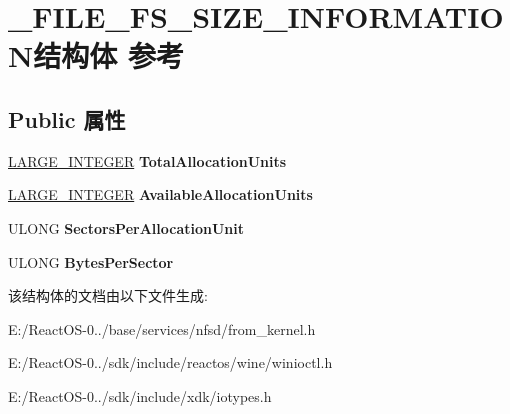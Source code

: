 \hypertarget{struct___f_i_l_e___f_s___s_i_z_e___i_n_f_o_r_m_a_t_i_o_n}{}\section{\+\_\+\+F\+I\+L\+E\+\_\+\+F\+S\+\_\+\+S\+I\+Z\+E\+\_\+\+I\+N\+F\+O\+R\+M\+A\+T\+I\+O\+N结构体 参考}
\label{struct___f_i_l_e___f_s___s_i_z_e___i_n_f_o_r_m_a_t_i_o_n}
\subsection*{Public 属性}
\begin{DoxyCompactItemize}
\item 
\mbox{\label{struct___f_i_l_e___f_s___s_i_z_e___i_n_f_o_r_m_a_t_i_o_n_abc81948e338a1ad72ca8ddcd96fad94d}} 
\hyperlink{union___l_a_r_g_e___i_n_t_e_g_e_r}{L\+A\+R\+G\+E\+\_\+\+I\+N\+T\+E\+G\+ER} {\bfseries Total\+Allocation\+Units}
\item 
\mbox{\label{struct___f_i_l_e___f_s___s_i_z_e___i_n_f_o_r_m_a_t_i_o_n_ac266456104fc22acd3324a9cd8094c68}} 
\hyperlink{union___l_a_r_g_e___i_n_t_e_g_e_r}{L\+A\+R\+G\+E\+\_\+\+I\+N\+T\+E\+G\+ER} {\bfseries Available\+Allocation\+Units}
\item 
\mbox{\label{struct___f_i_l_e___f_s___s_i_z_e___i_n_f_o_r_m_a_t_i_o_n_af42fc8ad469218898445a9f0f7460df9}} 
U\+L\+O\+NG {\bfseries Sectors\+Per\+Allocation\+Unit}
\item 
\mbox{\label{struct___f_i_l_e___f_s___s_i_z_e___i_n_f_o_r_m_a_t_i_o_n_a84d765e5357ff9b9228a64dd001cd92f}} 
U\+L\+O\+NG {\bfseries Bytes\+Per\+Sector}
\end{DoxyCompactItemize}


该结构体的文档由以下文件生成\+:\begin{DoxyCompactItemize}
\item 
E\+:/\+React\+O\+S-\/0../base/services/nfsd/from\+\_\+kernel.\+h\item 
E\+:/\+React\+O\+S-\/0../sdk/include/reactos/wine/winioctl.\+h\item 
E\+:/\+React\+O\+S-\/0../sdk/include/xdk/iotypes.\+h\end{DoxyCompactItemize}
